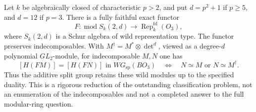 \begin{proposition}
\label{C:BO3_wild_gate}
Let $k$ be algebraically closed of characteristic $p>2$, and put
$d=p^2+1$ if $p\geq5$, and $d=12$ if $p=3$. There is a fully faithful
exact functor
\[
 F:\operatorname{mod}S_k(2,d)\longrightarrow
             \operatorname{Rep}^{\mathrm{fd}}_k(O_3),
\]
where $S_k(2,d)$ is a Schur algebra of wild representation type.
The functor preserves indecomposables. With
$M^\dagger=M^*\otimes\det^d$, viewed as a degree-$d$ polynomial
$GL_2$-module, for indecomposable $M,N$ one has
\[
 [H(FM)]=[H(FN)]\text{ in }WG_{\mathrm{sp}}(BO_3)
 \quad\Longleftrightarrow\quad N\simeq M\text{ or }N\simeq M^\dagger.
                                                               \tag{C.3.17}
\]
Thus the additive split group retains these wild modules up to the
specified duality. This is a rigorous reduction of the outstanding
classification problem, not an enumeration of the indecomposables
and not a completed answer to the full modular-ring question.
\end{proposition}
